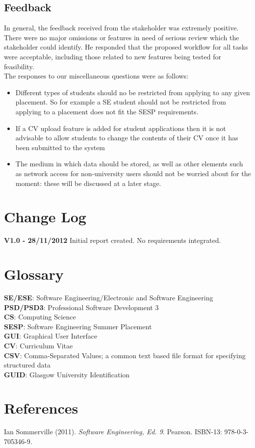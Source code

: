 \documentclass{l3deliverable}
\begin{document}
\subsection{Feedback}
In general, the feedback received from the stakeholder was extremely positive. There were no major omissions or features in need of serious review which the stakeholder could identify.
He responded that the proposed workflow for all tasks were acceptable, including those related to new features being tested for feasibility.\\

The responses to our miscellaneous questions were as follows:
\begin{itemize}
\item{Different types of students should no be restricted from applying to any given placement. So for example a SE student
should not be restricted from applying to a placement does not fit the SESP requirements.}
\item{If a CV upload feature is added for student applications then it is not advisable to allow students to change the contents of their CV once it has been submitted to the system}
\item{The medium in which data should be stored, as well as other elements such as network access for non-university users should not be worried about for the moment: these will be discussed at a later stage.}

\end{itemize}



\appendix

\section{Change Log}
\textbf{V1.0 - 28/11/2012} Initial report created. No requirements integrated.

\section{Glossary}
\textbf{SE/ESE}: Software Engineering/Electronic and Software Engineering\\
\textbf{PSD/PSD3}: Professional Software Development 3\\
\textbf{CS}: Computing Science\\
\textbf{SESP}: Software Engineering Summer Placement\\
\textbf{GUI}: Graphical User Interface\\
\textbf{CV}: Curriculum Vitae\\
\textbf{CSV}: Comma-Separated Values; a common text based file format for specifying structured data\\
\textbf{GUID}: Glasgow University Identification\\

\section{References}
\begin{thebibliography}{9}
Ian Sommerville (2011). \emph{Software Engineering, Ed. 9}. Pearson. ISBN-13: 978-0-3-705346-9.
\end{thebibliography}

\end{document}
